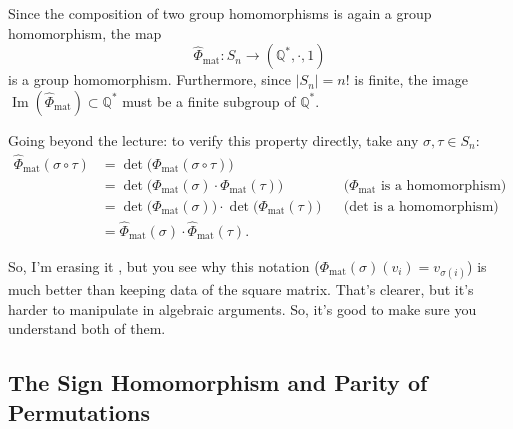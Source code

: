 \begin{content}[Composition \texorpdfstring{$\hat{\Phi}_{\text{mat}} := \det \circ \Phi_{\text{mat}}$}{Phi-hat\_mat := det o Phi\_mat}]
Since the composition of two group homomorphisms is again a group homomorphism, the map
\[
\hat{\Phi}_{\text{mat}} \colon S_n \longrightarrow (\mathbb{Q}^*, \cdot, 1)
\]
is a group homomorphism. Furthermore, since $|S_n| = n!$ is finite, the image $\operatorname{Im}(\hat{\Phi}_{\text{mat}}) \subset \mathbb{Q}^*$ must be a finite subgroup of $\mathbb{Q}^*$.

\begin{steps}
Going beyond the lecture: to verify this property directly, take any $\sigma, \tau \in S_n$:
\begin{align*}
\hat{\Phi}_{\text{mat}}(\sigma \circ \tau) &= \det\bigl(\Phi_{\text{mat}}(\sigma \circ \tau)\bigr) \\
&= \det\bigl(\Phi_{\text{mat}}(\sigma) \cdot \Phi_{\text{mat}}(\tau)\bigr) && \text{($\Phi_{\text{mat}}$ is a homomorphism)} \\
&= \det\bigl(\Phi_{\text{mat}}(\sigma)\bigr) \cdot \det\bigl(\Phi_{\text{mat}}(\tau)\bigr) && \text{($\det$ is a homomorphism)} \\
&= \hat{\Phi}_{\text{mat}}(\sigma) \cdot \hat{\Phi}_{\text{mat}}(\tau).
\end{align*}
\end{steps}
\end{content}

\begin{hidden}
\end{hidden}

\begin{speech}[00:20:13 - 00:20:47]
So, I'm erasing it , but you see why this notation ($\Phi_{\text{mat}}(\sigma)(v_i) = v_{\sigma(i)}$) is much better than keeping data of the square matrix. That's clearer, but it's harder to manipulate in algebraic arguments. So, it's good to make sure you understand both of them.
\end{speech}

\subsection{The Sign Homomorphism and Parity of Permutations}

